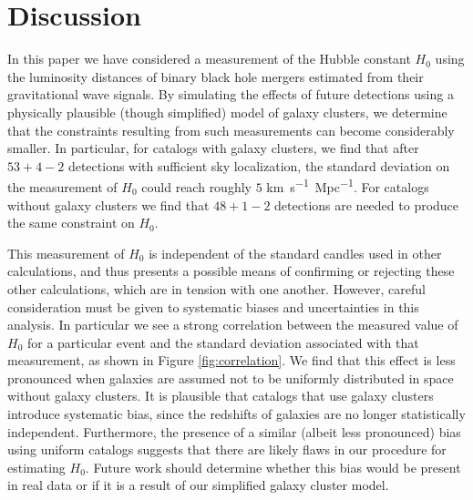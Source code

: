 \section{Discussion} \label{sec:conclusions}

In this paper we have considered a measurement of the Hubble constant $H_0$ using the luminosity distances of binary black hole mergers estimated from their gravitational wave signals.
By simulating the effects of future detections using a physically plausible (though simplified) model of galaxy clusters, we determine that the constraints resulting from such measurements can become considerably smaller.
In particular, for catalogs with galaxy clusters, we find that after $53 + 4 - 2$ detections with sufficient sky localization, the standard deviation on the measurement of $H_0$ could reach roughly $5$ \si{km.s^{-1}.Mpc^{-1}}. For catalogs without galaxy clusters we find that $48 + 1 - 2$ detections are needed to produce the same constraint on $H_0$.

This measurement of $H_0$ is independent of the standard candles used in other calculations, and thus presents a possible means of confirming or rejecting these other calculations, which are in tension with one another.
However, careful consideration must be given to systematic biases and uncertainties in this analysis.
In particular we see a strong correlation between the measured value of $H_0$ for a particular event and the standard deviation associated with that measurement, as shown in Figure \ref{fig:correlation}. We find that this effect is less pronounced when galaxies are assumed not to be uniformly distributed in space without galaxy clusters.
It is plausible that catalogs that use galaxy clusters introduce systematic bias, since the redshifts of galaxies are no longer statistically independent. Furthermore, the presence of a similar (albeit less pronounced) bias using uniform catalogs suggests that there are likely flaws in our procedure for estimating $H_0$.
Future work should determine whether this bias would be present in real data or if it is a result of our simplified galaxy cluster model.




